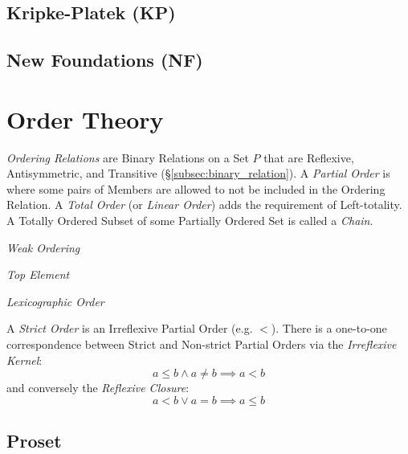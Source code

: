 \documentclass{article}
\begin{document}
\subsection{Kripke-Platek (KP)}\label{subsec:kripke_platek}

\subsection{New Foundations (NF)}\label{subsec:quine_foundations}



\section{Order Theory}\label{sec:order_theory}

\emph{Ordering Relations} are Binary Relations on a Set $P$ that are
Reflexive, Antisymmetric, and Transitive
(\S\ref{subsec:binary_relation}). A \emph{Partial Order} is where some
pairs of Members are allowed to not be included in the Ordering
Relation. A \emph{Total Order} (or \emph{Linear Order}) adds the
requirement of Left-totality. A Totally Ordered Subset of some
Partially Ordered Set is called a \emph{Chain}.

\emph{Weak Ordering}

\emph{Top Element}

\emph{Lexicographic Order}

A \emph{Strict Order} is an Irreflexive Partial Order (e.g. $<$).
There is a one-to-one correspondence between Strict and Non-strict
Partial Orders via the \emph{Irreflexive Kernel}:
\[
    a \leq b \wedge a \neq b \implies a < b
\]
and conversely the \emph{Reflexive Closure}:
\[
    a < b \vee a = b \implies a \leq b
\]



\subsection{Proset}\label{subsec:proset}
\end{document}
